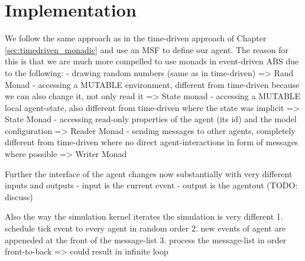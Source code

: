 \section{Implementation}
\label{sec:eventdriven_implementation}

We follow the same approach as in the time-driven approach of Chapter \ref{sec:timedriven_monadic} and use an MSF to define our agent. The reason for this is that we are much more compelled to use monads in event-driven ABS due to the following: 
- drawing random numbers (same as in time-driven) => Rand Monad
- accessing a MUTABLE environment, different from time-driven because we can also change it, not only read it => State monad
- accessing a MUTABLE local agent-state, also different from time-driven where the state was implicit => State Monad
- accessing read-only properties of the agent (its id) and the model configuration => Reader Monad
- sending messages to other agents, completely different from time-driven where no direct agent-interactions in form of messages where possible => Writer Monad

Further the interface of the agent changes now substantially with very different inputs and outputs
- input is the current event
- output is the agentout (TODO: discuss)

Also the way the simulation kernel iterates the simulation is very different
1. schedule tick event to every agent in random order
2. new events of agent are appeneded at the front of the message-list
3. process the message-list in order front-to-back => could result in infinite loop